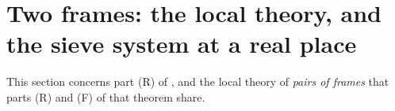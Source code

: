 \documentclass[10pt]{amsart}
\theoremstyle{definition}
\theoremstyle{remark}
\begin{document}
\providecommand{\panot}[1]{\par\smallskip{\raggedright\noindent\textbf{[Not proved here:} #1\textbf{]}\par}\smallskip}
\providecommand{\pbdeg}{\operatorname{deg}}
\providecommand{\pbvol}{\operatorname{vol}}
\providecommand{\pbmTh}{\Theta}
\providecommand{\pfrG}{\mathsf G}
\providecommand{\pfrH}{\mathsf H}
\providecommand{\pfrU}{\mathsf U}
\providecommand{\pfrR}{\mathsf R}
\providecommand{\pfrM}{\mathsf M}
\providecommand{\pfrm}{\mathsf m}
\providecommand{\pfrK}{\mathsf K}
\providecommand{\pfrP}{\mathcal P}
\providecommand{\pfrCl}{\mathcal C}
\providecommand{\pfrI}{\mathcal I}
\providecommand{\pfrF}{\mathsf F}
\providecommand{\pfrB}{\mathsf B}
\providecommand{\pfrmod}{\operatorname{mod}}
\providecommand{\pfrdep}{\operatorname{dp}}
\providecommand{\pfrwt}{\wp}
\providecommand{\pfrkap}{\kappa}
\providecommand{\pfrS}{\mathsf S}
\providecommand{\pfrL}{\Lambda}
\providecommand{\pfrN}{\mathsf N}
\providecommand{\pfrX}{\Xi}
\providecommand{\pfrip}[2]{\langle#1,#2\rangle}
\providecommand{\pfrhw}{\mathsf w}
\providecommand{\pfrell}{\ell}

\section{Two frames: the local theory, and the sieve system at a real place}\label{pfr:sec}

This section concerns part \textup{(R)} of {\cite[Theorem~3.51]{P51}}, and the local theory of
\emph{pairs of frames} that parts \textup{(R)} and \textup{(F)} of that theorem share.
\end{document}
